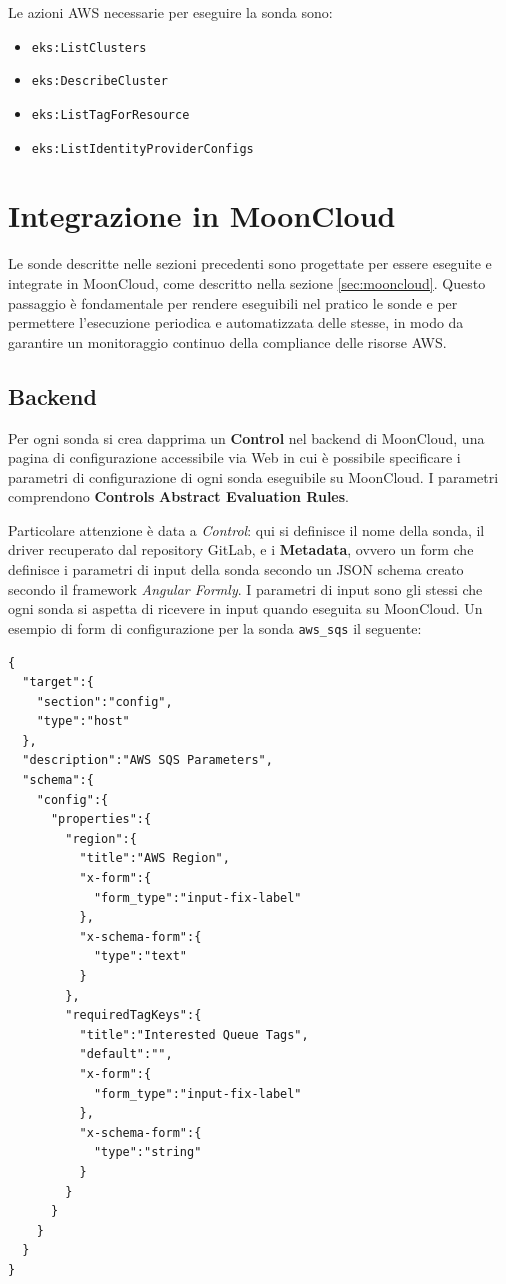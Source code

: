 Le azioni AWS necessarie per eseguire la sonda sono:
\begin{itemize}
    \item \texttt{eks:ListClusters}
    \item \texttt{eks:DescribeCluster}
    \item \texttt{eks:ListTagForResource}
    \item \texttt{eks:ListIdentityProviderConfigs}
\end{itemize}

\section{Integrazione in MoonCloud}
\label{sec:integrazione}

Le sonde descritte nelle sezioni precedenti sono progettate per essere eseguite e integrate in MoonCloud, come descritto nella sezione \ref{sec:mooncloud}. Questo passaggio è fondamentale per rendere eseguibili nel pratico le sonde e per permettere l'esecuzione periodica e automatizzata delle stesse, in modo da garantire un monitoraggio continuo della compliance delle risorse AWS. 

\subsection{Backend}
\label{sec:backend}

Per ogni sonda si crea dapprima un \textbf{Control} nel backend di MoonCloud, una pagina di configurazione accessibile via Web in cui è possibile specificare i parametri di configurazione di ogni sonda eseguibile su MoonCloud. I parametri comprendono \textbf{Controls} \textbf{Abstract Evaluation Rules}. 

Particolare attenzione è data a \textit{Control}: qui si definisce il nome della sonda, il driver recuperato dal repository GitLab, e i \textbf{Metadata}, ovvero un form che definisce i parametri di input della sonda secondo un JSON schema creato secondo il framework \textit{Angular Formly}. I parametri di input sono gli stessi che ogni sonda si aspetta di ricevere in input quando eseguita su MoonCloud. Un esempio di form di configurazione per la sonda \texttt{aws\_sqs} il seguente:

\begin{lstlisting}[style=myjson, caption={Form di configurazione per la sonda \texttt{aws\_sqs}}]
{
  "target":{
    "section":"config",
    "type":"host"
  },
  "description":"AWS SQS Parameters",
  "schema":{
    "config":{
      "properties":{
        "region":{
          "title":"AWS Region",
          "x-form":{
            "form_type":"input-fix-label"
          },
          "x-schema-form":{
            "type":"text"
          }
        },
        "requiredTagKeys":{
          "title":"Interested Queue Tags",
          "default":"",
          "x-form":{
            "form_type":"input-fix-label"
          },
          "x-schema-form":{
            "type":"string"
          }
        }
      }
    }
  }
}
\end{lstlisting}

